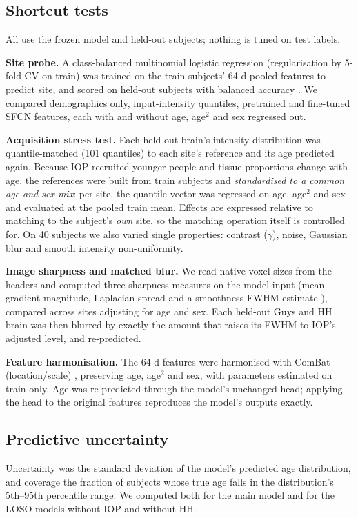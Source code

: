 \documentclass[conference]{IEEEtran}
\begin{document}
\subsection{Shortcut tests}
All use the frozen model and held-out subjects; nothing is tuned on test labels.

\textbf{Site probe.} A class-balanced multinomial logistic regression (regularisation by 5-fold CV on train) was trained on the train subjects' 64-d pooled features to predict site, and scored on held-out subjects with balanced accuracy \cite{alain2016probes,glocker2023encoding}. We compared demographics only, input-intensity quantiles, pretrained and fine-tuned SFCN features, each with and without age, age$^2$ and sex regressed out.

\textbf{Acquisition stress test.} Each held-out brain's intensity distribution was quantile-matched (101 quantiles) \cite{nyul2000standardization} to each site's reference and its age predicted again. Because IOP recruited younger people and tissue proportions change with age, the references were built from train subjects and \emph{standardised to a common age and sex mix}: per site, the quantile vector was regressed on age, age$^2$ and sex and evaluated at the pooled train mean. Effects are expressed relative to matching to the subject's \emph{own} site, so the matching operation itself is controlled for. On 40 subjects we also varied single properties: contrast ($\gamma$), noise, Gaussian blur and smooth intensity non-uniformity.

\textbf{Image sharpness and matched blur.} We read native voxel sizes from the headers and computed three sharpness measures on the model input (mean gradient magnitude, Laplacian spread and a smoothness FWHM estimate \cite{forman1995fwhm}), compared across sites adjusting for age and sex. Each held-out Guys and HH brain was then blurred by exactly the amount that raises its FWHM to IOP's adjusted level, and re-predicted.

\textbf{Feature harmonisation.} The 64-d features were harmonised with ComBat (location/scale) \cite{johnson2007combat,fortin2018harmonization}, preserving age, age$^2$ and sex, with parameters estimated on train only. Age was re-predicted through the model's unchanged head; applying the head to the original features reproduces the model's outputs exactly.

\subsection{Predictive uncertainty}
Uncertainty was the standard deviation of the model's predicted age distribution, and coverage the fraction of subjects whose true age falls in the distribution's 5th--95th percentile range. We computed both for the main model and for the LOSO models without IOP and without HH.
\end{document}
